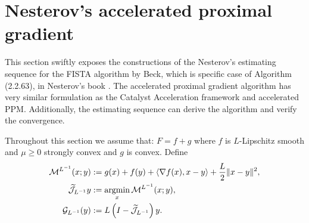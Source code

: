 \documentclass[12pt]{article}
\begin{document}
\section{Nesterov's accelerated proximal gradient}
    This section swiftly exposes the constructions of the Nesterov's estimating sequence for the FISTA algorithm by Beck\cite{beck_fast_2009-1}, which is specific case of Algorithm (2.2.63), in Nesterov's book \cite{nesterov_lectures_2018}. 
    The accelerated proximal gradient algorithm has very similar formulation as the Catalyst Acceleration framework and accelerated PPM. 
    Additionally, the estimating sequence can derive the algorithm and verify the convergence. 
    
    Throughout this section we assume that: $F = f + g$ where $f$ is $L$-Lipschitz smooth and $\mu \ge 0$ strongly convex and $g$ is convex. 
    Define 
    \begin{align*}
        \mathcal M^{L^{-1}}(x; y) 
        &:= g(x) + f(y) 
        + 
        \left\langle \nabla f(x), x - y\right\rangle 
        + 
        \frac{L}{2}\Vert x - y\Vert^2, 
        \\
        \widetilde{\mathcal J}_{L^{-1}}y 
        &:= \mathop{\rm argmin}\limits_{x} \mathcal M^{L^{-1}}(x; y), 
        \\
        \mathcal G_{L^{-1}}(y)
        &:= L\left(I - \widetilde{\mathcal J}_{L^{-1}}\right)y. 
    \end{align*}
\end{document}

